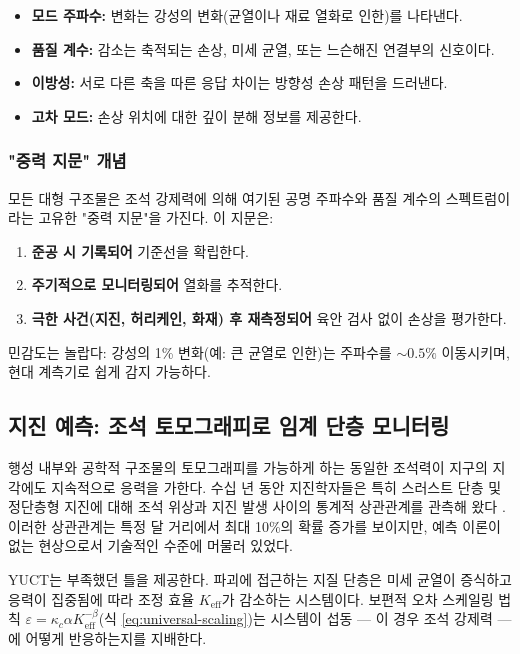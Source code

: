 \documentclass[12pt,a4paper]{article}
\theoremstyle{remark}
\begin{document}
	\begin{itemize}
		\item \textbf{모드 주파수:} 변화는 강성의 변화(균열이나 재료 열화로 인한)를 나타낸다.
		\item \textbf{품질 계수:} 감소는 축적되는 손상, 미세 균열, 또는 느슨해진 연결부의 신호이다.
		\item \textbf{이방성:} 서로 다른 축을 따른 응답 차이는 방향성 손상 패턴을 드러낸다.
		\item \textbf{고차 모드:} 손상 위치에 대한 깊이 분해 정보를 제공한다.
	\end{itemize}
	
	\subsubsection{"중력 지문" 개념}
	
	모든 대형 구조물은 조석 강제력에 의해 여기된 공명 주파수와 품질 계수의 스펙트럼이라는 고유한 "중력 지문"을 가진다. 이 지문은:
	\begin{enumerate}
		\item \textbf{준공 시 기록되어} 기준선을 확립한다.
		\item \textbf{주기적으로 모니터링되어} 열화를 추적한다.
		\item \textbf{극한 사건(지진, 허리케인, 화재) 후 재측정되어} 육안 검사 없이 손상을 평가한다.
	\end{enumerate}
	
	민감도는 놀랍다: 강성의 1\% 변화(예: 큰 균열로 인한)는 주파수를 \(\sim 0.5\%\) 이동시키며, 현대 계측기로 쉽게 감지 가능하다.
	
	\subsection{지진 예측: 조석 토모그래피로 임계 단층 모니터링}
	\label{sec:earthquakes}
	
	행성 내부와 공학적 구조물의 토모그래피를 가능하게 하는 동일한 조석력이 지구의 지각에도 지속적으로 응력을 가한다. 수십 년 동안 지진학자들은 특히 스러스트 단층 및 정단층형 지진에 대해 조석 위상과 지진 발생 사이의 통계적 상관관계를 관측해 왔다 \cite{Tanaka2012, Tolstoy2013, Sibgatulin2014, RAN2025}. 이러한 상관관계는 특정 달 거리에서 최대 10\%의 확률 증가를 보이지만, 예측 이론이 없는 현상으로서 기술적인 수준에 머물러 있었다.
	
	YUCT는 부족했던 틀을 제공한다. 파괴에 접근하는 지질 단층은 미세 균열이 증식하고 응력이 집중됨에 따라 조정 효율 \(K_{\mathrm{eff}}\)가 감소하는 시스템이다. 보편적 오차 스케일링 법칙 \(\varepsilon = \kappa_c \alpha K_{\mathrm{eff}}^{-\beta}\)(식 \ref{eq:universal-scaling})는 시스템이 섭동 — 이 경우 조석 강제력 — 에 어떻게 반응하는지를 지배한다.
	
\end{document}
